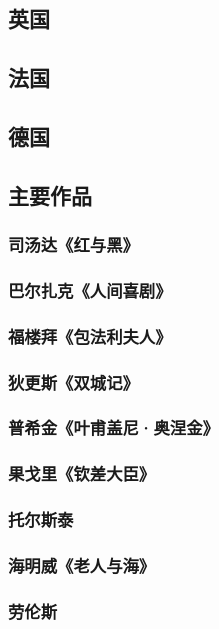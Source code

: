 \documentclass[UTF8]{../../RepresentationUniverse}
\begin{document}
\subsection{英国}

\subsection{法国}

\subsection{德国}

\subsection{主要作品}

\subsubsection{司汤达《红与黑》}
\subsubsection{巴尔扎克《人间喜剧》}
\subsubsection{福楼拜《包法利夫人》}
\subsubsection{狄更斯《双城记》}
\subsubsection{普希金《叶甫盖尼·奥涅金》}
\subsubsection{果戈里《钦差大臣》}
\subsubsection{托尔斯泰}
\subsubsection{海明威《老人与海》}
\subsubsection{劳伦斯}
\end{document}
